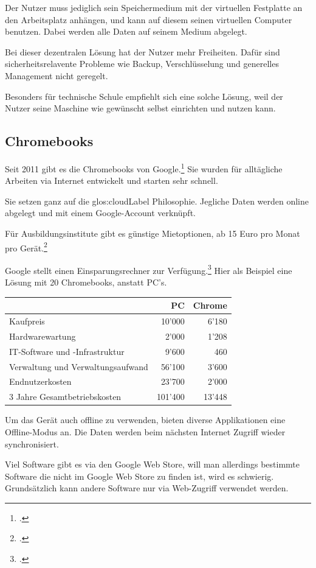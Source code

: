 Der Nutzer muss jediglich sein Speichermedium mit der virtuellen Festplatte an den Arbeitsplatz anhängen, und kann auf diesem seinen virtuellen Computer benutzen.
Dabei werden alle Daten auf seinem Medium abgelegt.

Bei dieser dezentralen Lösung hat der Nutzer mehr Freiheiten. Dafür sind sicherheitsrelavente Probleme wie Backup, Verschlüsselung und generelles Management nicht geregelt.

Besonders für technische Schule empfiehlt sich eine solche Lösung, weil der Nutzer seine Maschine wie gewünscht selbst einrichten und nutzen kann.

\subsection{Chromebooks}
Seit 2011 gibt es die Chromebooks von Google.\footcite{Chromebooks_bersicht_2014-12-27}
Sie wurden für alltägliche Arbeiten via Internet entwickelt und starten sehr schnell.

Sie setzen ganz auf die \Gls{glos:cloudLabel} Philosophie. Jegliche Daten werden online abgelegt und mit einem Google-Account verknüpft.

Für Ausbildungsinstitute gibt es günstige Mietoptionen, ab 15 Euro pro Monat pro Gerät.\footcite{Chromebook_Wikipedia_2014-12-27}

Google stellt einen Einsparungsrechner zur Verfügung.\footcite{Chromebooks_und_Chromeboxes_for_Education_2014-12-27}
Hier als Beispiel eine Lösung mit 20 Chromebooks, anstatt PC's.

\begin{table}[hb]
	\centering
	\small\renewcommand{\arraystretch}{1.4}

	\begin{tabular}{lrr}
		\hline
		\rowcolor{tableheadcolor}
		 & PC & Chrome \\
		\hline
		Kaufpreis & 10'000 & 6'180\\
		Hardwarewartung & 2'000 & 1'208\\
		IT-Software und -Infrastruktur & 9'600 & 460\\
		Verwaltung und Verwaltungsaufwand & 56'100 & 3'600\\
		Endnutzerkosten & 23'700 & 2'000\\
		3 Jahre Gesamtbetriebskosten & 101'400 & 13'448\\
		\hline
	\end{tabular}
\end{table}

Um das Gerät auch offline zu verwenden, bieten diverse Applikationen eine Offline-Modus an. Die Daten werden beim nächsten Internet Zugriff wieder synchronisiert.

Viel Software gibt es via den Google Web Store, will man allerdings bestimmte Software die nicht im Google Web Store zu finden ist, wird es schwierig.
Grundsätzlich kann andere Software nur via Web-Zugriff verwendet werden.
